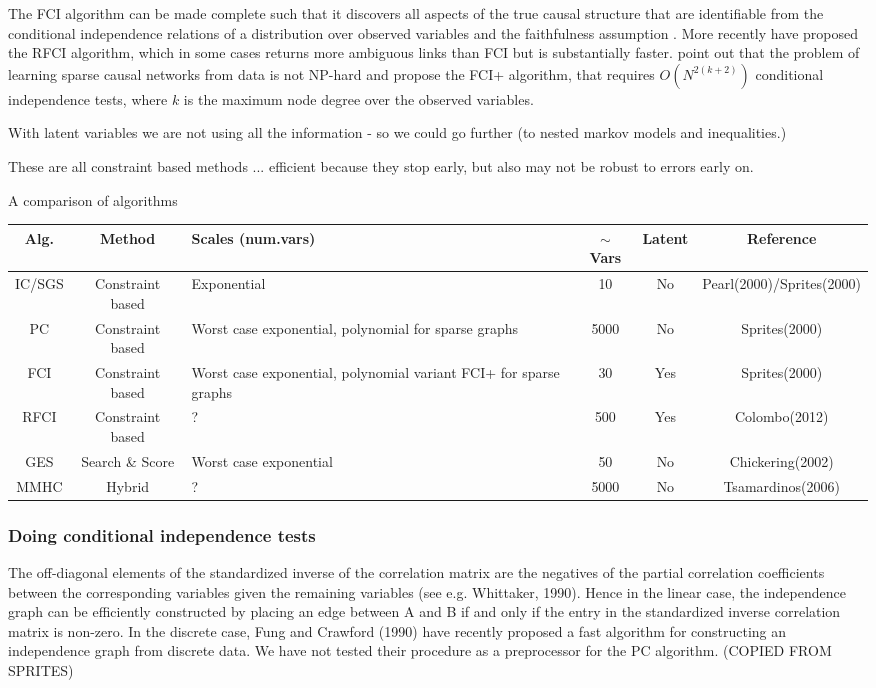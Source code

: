 \documentclass[11pt,a4paper]{article}
\begin{document}
The FCI algorithm can be made complete such that it discovers all aspects of the true causal structure that are identifiable from the conditional independence relations of a distribution over observed variables and the faithfulness assumption \cite{Zhang2008}. More recently \cite{Colombo2012} have proposed the RFCI algorithm, which in some cases returns more ambiguous links than FCI but is substantially faster. \cite{Claassen2013} point out that the problem of learning sparse causal networks from data is not NP-hard and propose the FCI+ algorithm, that requires $O(N^{2(k+2)})$ conditional independence tests, where $k$ is the maximum node degree over the observed variables. 

With latent variables we are not using all the information - so we could go further (to nested markov models and inequalities.) \cite{Richardson2012} \cite{Shipster2014}


These are all constraint based methods ... efficient because they stop early, but also may not be robust to errors early on. 

A comparison of algorithms 

\renewcommand{\arraystretch}{1.5}
\begin{tabular}{| c | c | p{4cm} | c | c | c |}
\hline
  \textbf {Alg.} &\textbf{ Method }& \textbf{Scales (num.vars) }& $\sim $ \textbf {Vars} & \textbf {Latent } & \textbf {Reference} \\
  \hline
  IC/SGS & Constraint based & Exponential & 10 & No & Pearl(2000)/Sprites(2000)\\
  \hline
  PC & Constraint based & Worst case exponential, polynomial for sparse graphs & 5000 & No & Sprites(2000) \\ 
  \hline
  FCI & Constraint based & Worst case exponential, polynomial variant FCI+ for sparse graphs & 30 & Yes & Sprites(2000) \\
  \hline
  RFCI & Constraint based & ? & 500 & Yes & Colombo(2012) \\
  \hline
  GES & Search \& Score  & Worst case exponential & 50 & No & Chickering(2002) \\
  \hline
  MMHC & Hybrid & ? & 5000 & No & Tsamardinos(2006) \\
 \hline
\end{tabular}

\subsubsection{Doing conditional independence tests}
The off-diagonal elements of the standardized inverse of the correlation
matrix are the negatives of the partial correlation coefficients between the corresponding
variables given the remaining variables (see e.g. Whittaker, 1990). Hence in the linear case, the
independence graph can be efficiently constructed by placing an edge between A and B if and
only if the entry in the standardized inverse correlation matrix is non-zero. In the discrete case,
Fung and Crawford (1990) have recently proposed a fast algorithm for constructing an
independence graph from discrete data. We have not tested their procedure as a preprocessor for
the PC algorithm. (COPIED FROM SPRITES)
\end{document}
